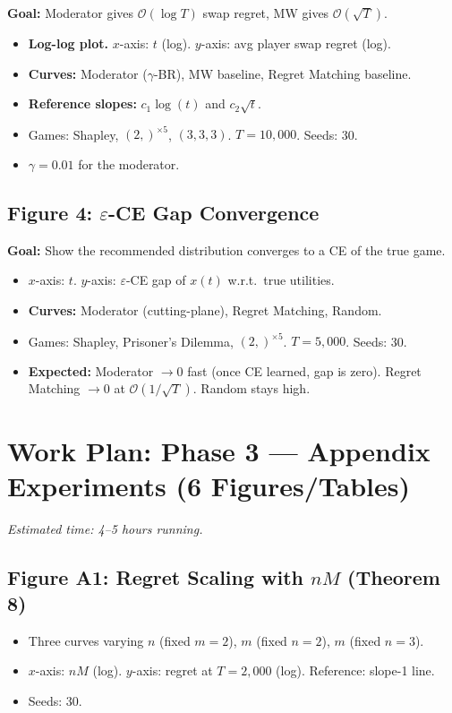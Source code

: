 \documentclass[11pt]{article}
\newcommand{\bigO}{\mathcal{O}}
\begin{document}
\textbf{Goal:} Moderator gives $\bigO(\log T)$ swap regret, MW gives $\bigO(\sqrt{T})$.

\begin{itemize}[nosep]
    \item \textbf{Log-log plot.} $x$-axis: $t$ (log). $y$-axis: avg player swap regret (log).
    \item \textbf{Curves:} Moderator ($\gamma$-BR), MW baseline, Regret Matching baseline.
    \item \textbf{Reference slopes:} $c_1 \log(t)$ and $c_2 \sqrt{t}$.
    \item Games: Shapley, $(2,)^{\times 5}$, $(3,3,3)$. $T = 10{,}000$. Seeds: 30.
    \item $\gamma = 0.01$ for the moderator.
\end{itemize}

\subsection{Figure 4: $\varepsilon$-CE Gap Convergence}

\textbf{Goal:} Show the recommended distribution converges to a CE of the true game.

\begin{itemize}[nosep]
    \item $x$-axis: $t$. $y$-axis: $\varepsilon$-CE gap of $x(t)$ w.r.t.\ true utilities.
    \item \textbf{Curves:} Moderator (cutting-plane), Regret Matching, Random.
    \item Games: Shapley, Prisoner's Dilemma, $(2,)^{\times 5}$. $T = 5{,}000$. Seeds: 30.
    \item \textbf{Expected:} Moderator $\to 0$ fast (once CE learned, gap is zero). Regret Matching $\to 0$ at $\bigO(1/\sqrt{T})$. Random stays high.
\end{itemize}

\section{Work Plan: Phase 3 --- Appendix Experiments (6 Figures/Tables)}

\textit{Estimated time: 4--5 hours running.}

\subsection{Figure A1: Regret Scaling with $nM$ (Theorem 8)}
\begin{itemize}[nosep]
    \item Three curves varying $n$ (fixed $m{=}2$), $m$ (fixed $n{=}2$), $m$ (fixed $n{=}3$).
    \item $x$-axis: $nM$ (log). $y$-axis: regret at $T{=}2{,}000$ (log). Reference: slope-1 line.
    \item Seeds: 30.
\end{itemize}
\end{document}
